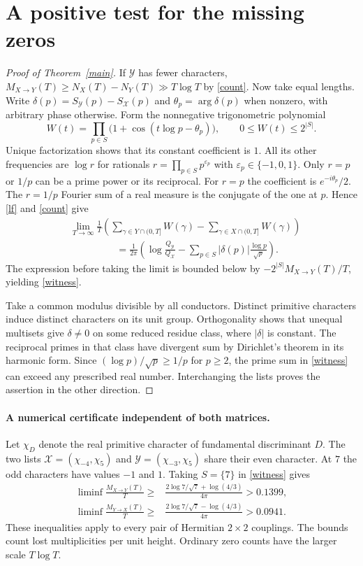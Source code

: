 \documentclass[11pt]{article}
\newcommand{\cX}{\mathcal X}
\newcommand{\cY}{\mathcal Y}
\begin{document}
\section{A positive test for the missing zeros}
\begin{proof}[Proof of Theorem~\ref{main}]
If $\cY$ has fewer characters, $M_{X\to Y}(T)\ge N_X(T)-N_Y(T)\gg T\log T$ by \eqref{count}. Now take equal lengths. Write $\delta(p)=S_{\cY}(p)-S_{\cX}(p)$ and $\theta_p=\arg\delta(p)$ when nonzero, with arbitrary phase otherwise. Form the nonnegative trigonometric polynomial
\[
 W(t)=\prod_{p\in S}\bigl(1+\cos(t\log p-\theta_p)\bigr),\qquad
                        0\le W(t)\le 2^{|S|}.
\]
Unique factorization shows that its constant coefficient is $1$. All its other frequencies are $\log r$ for rationals $r=\prod_{p\in S}p^{\varepsilon_p}$ with $\varepsilon_p\in\{-1,0,1\}$. Only $r=p$ or $1/p$ can be a prime power or its reciprocal. For $r=p$ the coefficient is $e^{-i\theta_p}/2$. The $r=1/p$ Fourier sum of a real measure is the conjugate of the one at $p$. Hence \eqref{lf} and \eqref{count} give
\begin{align*}
 &\lim_{T\to\infty}\frac1T\left(\sum_{\gamma\in Y\cap(0,T]}W(\gamma)
                        -\sum_{\gamma\in X\cap(0,T]}W(\gamma)\right)\\
 &\hspace{2cm}=\frac1{2\pi}\left(\log\frac{Q_{\cY}}{Q_{\cX}}
               -\sum_{p\in S}|\delta(p)|\frac{\log p}{\sqrt p}\right).
\end{align*}
The expression before taking the limit is bounded below by $-2^{|S|} M_{X\to Y}(T)/T$, yielding \eqref{witness}.

Take a common modulus divisible by all conductors. Distinct primitive characters induce distinct characters on its unit group. Orthogonality shows that unequal multisets give $\delta\ne0$ on some reduced residue class, where $|\delta|$ is constant. The reciprocal primes in that class have divergent sum by Dirichlet's theorem in its harmonic form. Since $(\log p)/\sqrt p\ge1/p$ for $p\ge2$, the prime sum in \eqref{witness} can exceed any prescribed real number. Interchanging the lists proves the assertion in the other direction.
\end{proof}

\paragraph{A numerical certificate independent of both matrices.}
Let $\chi_D$ denote the real primitive character of fundamental discriminant $D$. The two lists $\cX=(\chi_{-4},\chi_5)$ and $\cY=(\chi_{-3},\chi_5)$ share their even character. At $7$ the odd characters have values $-1$ and $1$. Taking $S=\{7\}$ in \eqref{witness} gives
\begin{align*}
 \liminf\frac{M_{X\to Y}(T)}T\ge
 &\frac{2\log 7/\sqrt7+\log(4/3)}{4\pi}>0.1399,\\
 \liminf\frac{M_{Y\to X}(T)}T\ge
 &\frac{2\log 7/\sqrt7-\log(4/3)}{4\pi}>0.0941 .
\end{align*}
These inequalities apply to every pair of Hermitian $2\times2$ couplings. The bounds count lost multiplicities per unit height. Ordinary zero counts have the larger scale $T\log T$.
\end{document}
